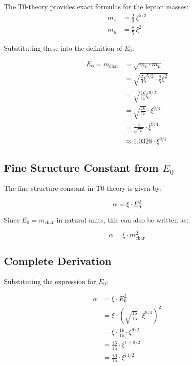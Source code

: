 \documentclass[12pt,a4paper]{article}
\newcommand{\xipar}{\xi}  %
\begin{document}
The T0-theory provides exact formulas for the lepton masses:
\begin{align}
	m_e &= \frac{2}{3} \, \xipar^{5/2} \\
	m_\mu &= \frac{8}{5} \, \xipar^2
\end{align}

Substituting these into the definition of $E_0$:

\begin{align}
	E_0 = m_{\text{char}} &= \sqrt{m_e \cdot m_\mu} \\
	&= \sqrt{\frac{2}{3} \xipar^{5/2} \cdot \frac{8}{5} \xipar^2} \\
	&= \sqrt{\frac{16}{15} \xipar^{9/2}} \\
	&= \sqrt{\frac{16}{15}} \cdot \xipar^{9/4} \\
	&= \frac{4}{\sqrt{15}} \cdot \xipar^{9/4} \\
	&\approx 1.0328 \cdot \xipar^{9/4}
\end{align}

\subsection{Fine Structure Constant from $E_0$}

The fine structure constant in T0-theory is given by:

\begin{equation}
	\boxed{\alpha = \xipar \cdot E_0^2}
\end{equation}

Since $E_0 = m_{\text{char}}$ in natural units, this can also be written as:

\begin{equation}
	\alpha = \xipar \cdot m_{\text{char}}^2
\end{equation}

\subsection{Complete Derivation}

Substituting the expression for $E_0$:

\begin{align}
	\alpha &= \xipar \cdot E_0^2 \\
	&= \xipar \cdot \left( \sqrt{\frac{16}{15}} \cdot \xipar^{9/4} \right)^2 \\
	&= \xipar \cdot \frac{16}{15} \cdot \xipar^{9/2} \\
	&= \frac{16}{15} \cdot \xipar^{1 + 9/2} \\
	&= \frac{16}{15} \cdot \xipar^{11/2}
\end{align}
\end{document}
